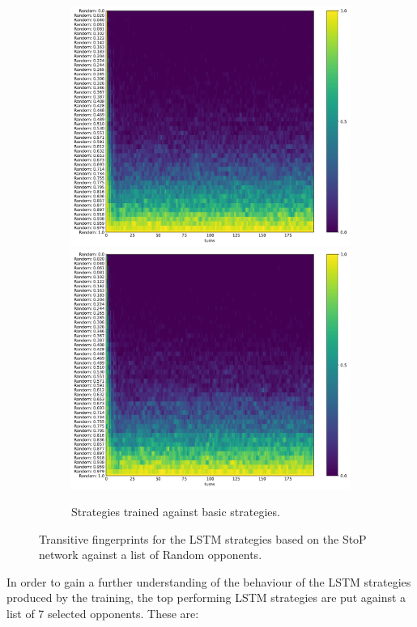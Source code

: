 \begin{figure}[!htbp]
\begin{subfigure}{\textwidth}
        \includegraphics[width=.3\textwidth]{src/chapters/07/img/default_basic_classification_1.pdf}
        \includegraphics[width=.3\textwidth]{src/chapters/07/img/default_basic_classification_0_78.pdf}
        \caption{Strategies trained against basic strategies.}
    \end{subfigure}
    \caption{Transitive fingerprints for the LSTM strategies based on the StoP
    network against a list of Random opponents.}\label{fig:transitive_fingerprints_default_s_to_p}
\end{figure}

In order to gain a further understanding of the behaviour of the LSTM strategies
produced by the training, the top performing LSTM strategies are put against a
list of 7 selected opponents. These are:

